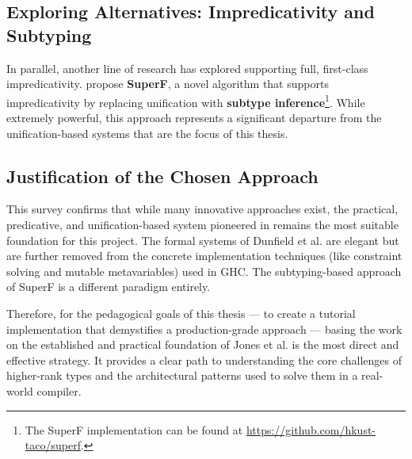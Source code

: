 \subsection{Exploring Alternatives: Impredicativity and Subtyping}

In parallel, another line of research has explored supporting full, first-class impredicativity. \citeauthor{parreaux-when-2024} \cite{parreaux-when-2024} propose \textbf{SuperF}, a novel algorithm that supports impredicativity by replacing unification with \textbf{subtype inference}\footnote{The SuperF implementation can be found at \url{https://github.com/hkust-taco/superf}.}. While extremely powerful, this approach represents a significant departure from the unification-based systems that are the focus of this thesis.

\subsection{Justification of the Chosen Approach}

This survey confirms that while many innovative approaches exist, the practical, predicative, and unification-based system pioneered in \cite{jones-practical-2007} remains the most suitable foundation for this project. The formal systems of Dunfield et al. are elegant but are further removed from the concrete implementation techniques (like constraint solving and mutable metavariables) used in GHC. The subtyping-based approach of SuperF is a different paradigm entirely.

Therefore, for the pedagogical goals of this thesis --- to create a tutorial implementation that demystifies a production-grade approach --- basing the work on the established and practical foundation of Jones et al. is the most direct and effective strategy. It provides a clear path to understanding the core challenges of higher-rank types and the architectural patterns used to solve them in a real-world compiler.